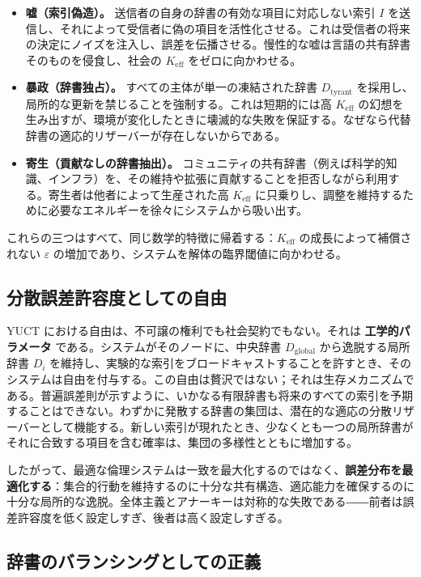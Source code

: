 \documentclass[12pt,a4paper]{article}
\newcommand{\Keff}{K_{\mathrm{eff}}}
\begin{document}
	\begin{itemize}[leftmargin=*]
		\item \textbf{嘘（索引偽造）。} 送信者の自身の辞書の有効な項目に対応しない索引 \(I\) を送信し、それによって受信者に偽の項目を活性化させる。これは受信者の将来の決定にノイズを注入し、誤差を伝播させる。慢性的な嘘は言語の共有辞書そのものを侵食し、社会の \(K_{\mathrm{eff}}\) をゼロに向かわせる。
		\item \textbf{暴政（辞書独占）。} すべての主体が単一の凍結された辞書 \(D_{\text{tyrant}}\) を採用し、局所的な更新を禁じることを強制する。これは短期的には高 \(\Keff\) の幻想を生み出すが、環境が変化したときに壊滅的な失敗を保証する。なぜなら代替辞書の適応的リザーバーが存在しないからである。
		\item \textbf{寄生（貢献なしの辞書抽出）。} コミュニティの共有辞書（例えば科学的知識、インフラ）を、その維持や拡張に貢献することを拒否しながら利用する。寄生者は他者によって生産された高 \(K_{\mathrm{eff}}\) に只乗りし、調整を維持するために必要なエネルギーを徐々にシステムから吸い出す。
	\end{itemize}
	
	これらの三つはすべて、同じ数学的特徴に帰着する：\(K_{\mathrm{eff}}\) の成長によって補償されない \(\varepsilon\) の増加であり、システムを解体の臨界閾値に向かわせる。
	
	\subsection{分散誤差許容度としての自由}
	
	YUCT における自由は、不可譲の権利でも社会契約でもない。それは \textbf{工学的パラメータ} である。システムがそのノードに、中央辞書 \(D_{\text{global}}\) から逸脱する局所辞書 \(D_i\) を維持し、実験的な索引をブロードキャストすることを許すとき、そのシステムは自由を付与する。この自由は贅沢ではない；それは生存メカニズムである。普遍誤差則が示すように、いかなる有限辞書も将来のすべての索引を予期することはできない。わずかに発散する辞書の集団は、潜在的な適応の分散リザーバーとして機能する。新しい索引が現れたとき、少なくとも一つの局所辞書がそれに合致する項目を含む確率は、集団の多様性とともに増加する。
	
	したがって、最適な倫理システムは一致を最大化するのではなく、\textbf{誤差分布を最適化する}：集合的行動を維持するのに十分な共有構造、適応能力を確保するのに十分な局所的な逸脱。全体主義とアナーキーは対称的な失敗である――前者は誤差許容度を低く設定しすぎ、後者は高く設定しすぎる。
	
	\subsection{辞書のバランシングとしての正義}
	
\end{document}
